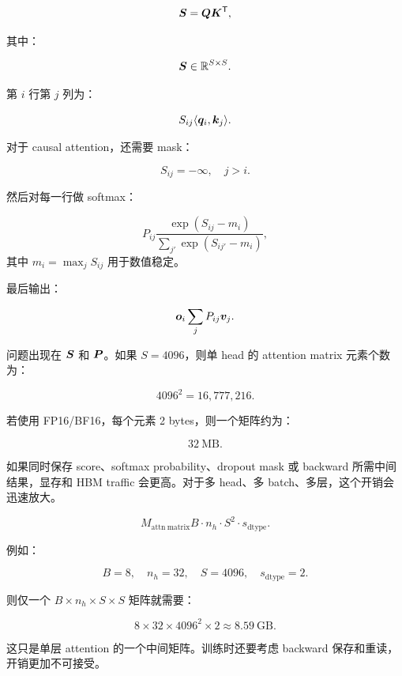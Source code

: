 \[
\bm{S}=\bm{Q}\bm{K}^{\mathsf{T}},
\]

其中：

\[
\bm{S}\in\mathbb{R}^{S\times S}.
\]

第 $i$ 行第 $j$ 列为：

\[
S_{ij}
\langle \bm{q}_i,\bm{k}_j\rangle.
\]

对于 causal attention，还需要 mask：

\[
S_{ij}=-\infty,\quad j>i.
\]

然后对每一行做 softmax：

\[
P_{ij}
\frac{\exp(S_{ij}-m_i)}
{\sum_{j'}\exp(S_{ij'}-m_i)},
\]
其中 $m_i=\max_j S_{ij}$ 用于数值稳定。

最后输出：

\[
\bm{o}_i
\sum_j P_{ij}\bm{v}_j.
\]

问题出现在 $\bm{S}$ 和 $\bm{P}$。如果 $S=4096$，则单 head 的 attention matrix 元素个数为：

\[
4096^2=16{,}777{,}216.
\]

若使用 FP16/BF16，每个元素 2 bytes，则一个矩阵约为：

\[
32\ \mathrm{MB}.
\]

如果同时保存 score、softmax probability、dropout mask 或 backward 所需中间结果，显存和 HBM traffic 会更高。对于多 head、多 batch、多层，这个开销会迅速放大。

\[
M_{\mathrm{attn\ matrix}}
B\cdot n_h\cdot S^2\cdot s_{\mathrm{dtype}}.
\]

例如：

\[
B=8,\quad n_h=32,\quad S=4096,\quad s_{\mathrm{dtype}}=2.
\]

则仅一个 $B\times n_h\times S\times S$ 矩阵就需要：

\[
8\times 32\times 4096^2\times 2
\approx
8.59\ \mathrm{GB}.
\]

这只是单层 attention 的一个中间矩阵。训练时还要考虑 backward 保存和重读，开销更加不可接受。

